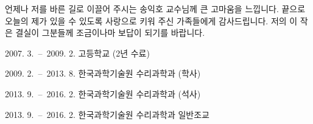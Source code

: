 \documentclass[master,english,final]{kaist-ucs} %
\begin{document}

\acknowledgment[1]
언제나 저를 바른 길로 이끌어 주시는 송익호 교수님께 큰 고마움을 느낍니다.
끝으로 오늘의 제가 있을 수 있도록 사랑으로 키워 주신 가족들에게 감사드립니다.
저의 이 작은 결실이 그분들께 조금이나마 보답이 되기를 바랍니다.



\curriculumvitae[1]

    \begin{personaldata}
        \address    { ...}
     \end{personaldata}

    \begin{education}
        \item[2007. 3.\ --\ 2009. 2.] 고등학교 (2년 수료)
        \item[2009. 2.\ --\ 2013. 8.] 한국과학기술원 수리과학과 (학사)
        \item[2013. 9.\ --\ 2016. 2.] 한국과학기술원 수리과학과 (석사)
    \end{education}

    \begin{career}
        \item[2013. 9.\ --\ 2016. 2.] 한국과학기술원 수리과학과 일반조교
    \end{career}
\end{document}
